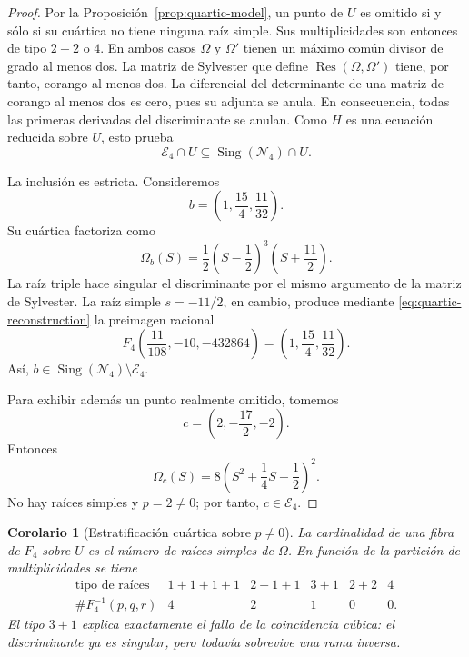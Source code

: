 \documentclass[11pt]{article}
\newtheorem{corollary}[theorem]{Corolario}
\theoremstyle{definition}
\theoremstyle{remark}
\newcommand{\Sing}{\operatorname{Sing}}
\begin{document}
\begin{proof}
Por la Proposici\'on~\ref{prop:quartic-model}, un punto de $U$ es omitido si
y s\'olo si su cu\'artica no tiene ninguna ra\'iz simple. Sus multiplicidades
son entonces de tipo $2+2$ o $4$. En ambos casos
$\Omega$ y $\Omega'$ tienen un m\'aximo com\'un divisor de grado al menos dos.
La matriz de Sylvester que define
$\operatorname{Res}(\Omega,\Omega')$ tiene, por tanto, corango al menos dos.
La diferencial del determinante de una matriz de corango al menos dos es
cero, pues su adjunta se anula. En consecuencia, todas las primeras derivadas
del discriminante se anulan. Como $H$ es una ecuaci\'on reducida sobre $U$,
esto prueba
\[
\mathcal E_4\cap U\subseteq\Sing(\mathcal N_4)\cap U.
\]

La inclusi\'on es estricta. Consideremos
\begin{equation}\label{eq:quartic-b}
b=\left(1,\frac{15}{4},\frac{11}{32}\right).
\end{equation}
Su cu\'artica factoriza como
\begin{equation}\label{eq:quartic-b-factor}
\Omega_b(S)
=\frac12\left(S-\frac12\right)^3
\left(S+\frac{11}{2}\right).
\end{equation}
La ra\'iz triple hace singular el discriminante por el mismo argumento de la
matriz de Sylvester. La ra\'iz simple $s=-11/2$, en cambio, produce mediante
\eqref{eq:quartic-reconstruction} la preimagen racional
\begin{equation}\label{eq:quartic-b-preimage}
F_4\left(\frac{11}{108},-10,-432864\right)
=\left(1,\frac{15}{4},\frac{11}{32}\right).
\end{equation}
As\'i,
$b\in\Sing(\mathcal N_4)\setminus\mathcal E_4$.

Para exhibir adem\'as un punto realmente omitido, tomemos
\begin{equation}\label{eq:quartic-c}
c=\left(2,-\frac{17}{2},-2\right).
\end{equation}
Entonces
\begin{equation}\label{eq:quartic-c-factor}
\Omega_c(S)
=8\left(S^2+\frac14S+\frac12\right)^2.
\end{equation}
No hay ra\'ices simples y $p=2\neq0$; por tanto, $c\in\mathcal E_4$.
\end{proof}

\begin{corollary}[Estratificaci\'on cu\'artica sobre $p\neq0$]
\label{cor:quartic-strata}
La cardinalidad de una fibra de $F_4$ sobre $U$ es el n\'umero de ra\'ices
simples de $\Omega$. En funci\'on de la partici\'on de multiplicidades se tiene
\[
\begin{array}{c|ccccc}
\text{tipo de ra\'ices}&1+1+1+1&2+1+1&3+1&2+2&4\\
\hline
\#F_4^{-1}(p,q,r)&4&2&1&0&0.
\end{array}
\]
El tipo $3+1$ explica exactamente el fallo de la coincidencia c\'ubica: el
discriminante ya es singular, pero todav\'ia sobrevive una rama inversa.
\end{corollary}
\end{document}
